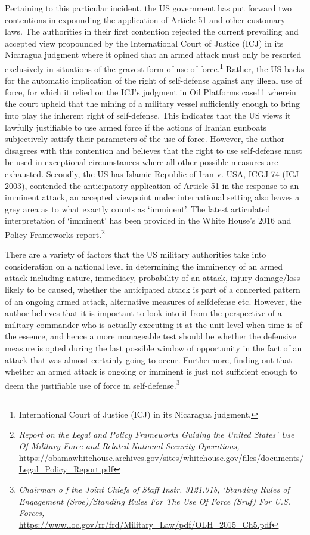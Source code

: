 \begin{multicols}{2}
\noi
Pertaining to this particular incident, the US government has put forward two contentions in
expounding the application of Article 51 and other customary laws. The authorities in their
first contention rejected the current prevailing and accepted view propounded by the
International Court of Justice (ICJ) in its Nicaragua judgment where it opined that an armed
attack must only be resorted exclusively in situations of the gravest form of use of force.\footnote{ International Court of Justice (ICJ) in its Nicaragua judgment.} Rather, the US backs for the automatic implication of the right of self-defense against any illegal use of force, for which it relied on the ICJ’s judgment in Oil Platforms case11 wherein
the court upheld that the mining of a military vessel sufficiently enough to bring into play
the inherent right of self-defense. This indicates that the US views it lawfully justifiable to
use armed force if the actions of Iranian gunboats subjectively satisfy their parameters of the
use of force. However, the author disagrees with this contention and believes that the right
to use self-defense must be used in exceptional circumstances where all other possible
measures are exhausted. Secondly, the US has Islamic Republic of Iran v. USA, ICGJ 74
(ICJ 2003), contended the anticipatory application of Article 51 in the response to an
imminent attack, an accepted viewpoint under international setting also leaves a grey area as
to what exactly counts as ‘imminent’. The latest articulated interpretation of ‘imminent’ has
been provided in the White House’s 2016 and Policy Frameworks report.\footnote{\textit{Report on the Legal and Policy Frameworks Guiding the United States’ Use Of Military Force and Related National Security Operations,}
 \url{https://obamawhitehouse.archives.gov/sites/whitehouse.gov/files/documents/Legal_Policy_Report.pdf}}

\noi
There are a variety of factors that the US military authorities take into consideration on a
national level in determining the imminency of an armed attack including nature, immediacy,
probability of an attack, injury damage/loss likely to be caused, whether the anticipated
attack is part of a concerted pattern of an ongoing armed attack, alternative measures of selfdefense etc. However, the author believes that it is important to look into it from the
perspective of a military commander who is actually executing it at the unit level when time
is of the essence, and hence a more manageable test should be whether the defensive
measure is opted during the last possible window of opportunity in the fact of an attack that was almost certainly going to occur. Furthermore, finding out that whether an armed attack
is ongoing or imminent is just not sufficient enough to deem the justifiable use of force in
self-defense.\footnote{\textit{Chairman o f the Joint Chiefs of Staff Instr. 3121.01b, ‘Standing Rules of Engagement (Sroe)/Standing Rules For The Use Of Force (Sruf) For U.S. Forces,} \url{https://www.loc.gov/rr/frd/Military_Law/pdf/OLH_2015_Ch5.pdf}}


\end{multicols}
